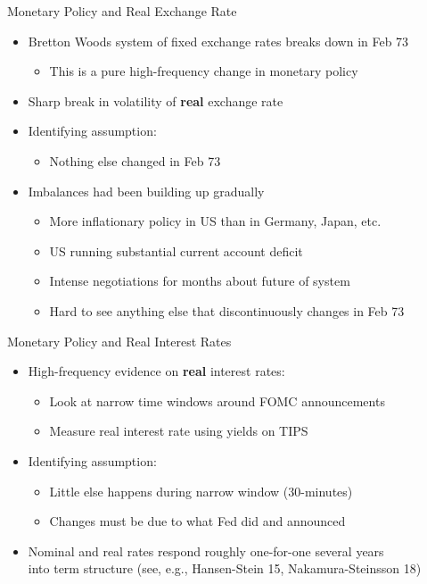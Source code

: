 \documentclass[11pt,aspectratio=169,xcolor={dvipsnames},hyperref={pdftex,pdfpagemode=UseNone,hidelinks,pdfdisplaydoctitle=true},usepdftitle=false]{beamer}
\begin{document}
\begin{frame}{Monetary Policy and Real Exchange Rate}
\begin{itemize}
\itemsep1em
\item Bretton Woods system of fixed exchange rates breaks down in Feb 73
\begin{itemize}
\item This is a pure high-frequency change in monetary policy 
\end{itemize}
\item Sharp break in volatility of \textbf{real} exchange rate \pause 
\item Identifying assumption: 
\begin{itemize}
\item Nothing else changed {\color{red}{discontinuously}} in Feb 73
\end{itemize}
\item Imbalances had been building up gradually 
\begin{itemize}
\item More inflationary policy in US than in Germany, Japan, etc. 
\item US running substantial current account deficit
\item Intense negotiations for months about future of system
\item Hard to see anything else that discontinuously changes in Feb 73
\end{itemize}

\end{itemize}
\end{frame}

\begin{frame}{Monetary Policy and Real Interest Rates}
\begin{itemize}
\itemsep1em
\item High-frequency evidence on \textbf{real} interest rates:
\begin{itemize}
\item Look at narrow time windows around FOMC announcements
\item Measure real interest rate using yields on TIPS
\end{itemize}
\item Identifying assumption:
\begin{itemize}
\item Little else happens during narrow window (30-minutes)
\item Changes must be due to what Fed did and announced
\end{itemize}
\item Nominal and real rates respond roughly one-for-one several years \\ into term structure {\footnotesize (see, e.g., Hansen-Stein 15, Nakamura-Steinsson 18)}
\end{itemize}
\end{frame}
\end{document}
